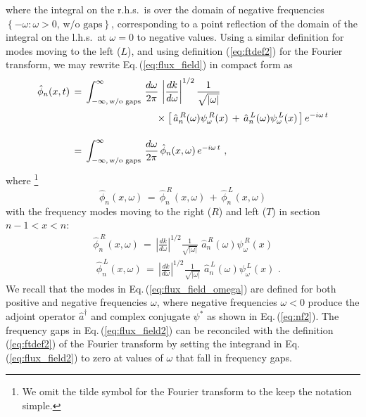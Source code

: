 %
where the integral on the r.h.s.~is over the domain of negative frequencies
$\left\{ - \omega: \omega > 0, \, \text{w/o gaps} \right\}$, 
corresponding to a point reflection of the domain of the integral on the l.h.s.~at $\omega = 0$ 
to negative values. Using a similar definition for modes moving to the left ($L$), and using 
definition (\ref{eq:ftdef2}) for the Fourier transform, we may 
rewrite Eq.\,(\ref{eq:flux_field}) in compact form as
%
\begin{equation} \label{eq:flux_field2}
\begin{split}
    \hat{\phi}_n(x,t) \, & = \, 
    \displaystyle{
    \int_{-\infty, \, \text{w/o gaps}}^{\infty} \, \frac{d\omega}{2 \pi} \, \left| \frac{d k}{d \omega} \right|^{1/2}
        \frac{1}{\sqrt{|\omega|}}} \\[1mm]
    & \hspace{30mm} \times \left[ \, \hat{a}_n^{\,R}(\omega) \psi_{\omega}^{\,R}(x) \, + \, 
      \hat{a}_n^{\,L}(\omega) \psi_{\omega}^{\,L}(x)  \, \right] e^{-i \omega \, t} \\[4mm]
 & = \,  \int_{-\infty, \, \text{w/o gaps}}^{\infty} \, \frac{d\omega}{2 \pi} \,
     \hat{\phi}_n(x,\omega) \, e^{-i \omega \, t} \, \, ,
\end{split}
\end{equation}
%
where
%
\footnote{We omit the tilde symbol for the Fourier transform to the keep the notation simple.}
%
\begin{equation} \label{eq:flux_field3}
\hat{\phi}_n(x,\omega) \, = \, \hat{\phi}_n^{\,R}(x,\omega) \, + \, \hat{\phi}_n^{\,L}(x,\omega)
\end{equation}
%
with the frequency modes moving to the right ($R$)
and left ($T$) in section $n-1 < x < n$:
%
\begin{subequations} \label{eq:flux_field_omega}
\begin{eqnarray}
& \hat{\phi}_n^{\,R}(x,\omega) \, = \, \displaystyle{\left| \frac{d k}{d \omega} \right|^{1/2}
        \frac{1}{\sqrt{|\omega|}}} \, \, \hat{a}_n^{\,R}(\omega) \psi_{\omega}^{\,R}(x) \\[2mm]
& \, \, \hat{\phi}_n^{\,L}(x,\omega) \, = \, \displaystyle{\left| \frac{d k}{d \omega} \right|^{1/2}
        \frac{1}{\sqrt{|\omega|}}} \, \, \hat{a}_n^{\,L}(\omega) \psi_{\omega}^{\,L}(x) \, \, . 
\end{eqnarray}
\end{subequations}
%
We recall that the modes in Eq.\,(\ref{eq:flux_field_omega}) are defined for both positive and 
negative frequencies $\omega$, where negative frequencies $\omega<0$
produce the adjoint operator $\hat{a}^{\dagger}$ 
and complex conjugate $\psi^*$ as shown in Eq.\,(\ref{eq:nf2}). 
The frequency gaps in Eq.\,(\ref{eq:flux_field2}) can be reconciled with 
the definition (\ref{eq:ftdef2}) of the Fourier transform by setting the integrand in 
Eq.\,(\ref{eq:flux_field2}) to zero at values of $\omega$ that fall in frequency gaps. 


